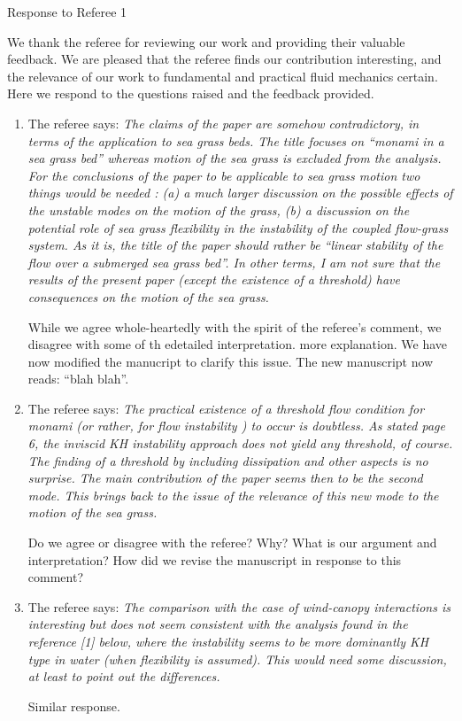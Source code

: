 \documentclass[letterpaper,10pt]{article}
\begin{document}
\centerline{Response to Referee 1}
We thank the referee for reviewing our work and providing their valuable feedback. 
We are pleased that the referee finds our contribution interesting, and the relevance of our work to fundamental and practical fluid mechanics certain.
Here we respond to the questions raised and the feedback provided.

\begin{enumerate}
\item The referee says:
\textit{
The claims of the paper are somehow contradictory, in terms of the application to sea grass beds. The title focuses on “monami in a sea grass bed” whereas motion of the sea grass is excluded from the analysis.  For the conclusions of the paper to be applicable to sea grass motion two things would be needed : (a) a much larger discussion on the possible effects of the unstable modes on the motion of the grass, (b) a discussion on the potential role of sea grass flexibility in the instability of the coupled flow-grass system. As it is, the  title of the paper should rather  be “linear stability of the flow over a submerged sea grass bed”. In other terms, I am not sure that the results of the present paper (except the existence of a threshold) have consequences on the motion of the sea grass.
}

While we agree whole-heartedly with the spirit of the referee's comment, we disagree with some of th edetailed interpretation. more explanation. We have now modified the manucript to clarify this issue. The new manuscript now reads: ``blah blah''.

\item The referee says:
\textit{
The practical existence of a threshold flow condition for monami (or rather,  for flow instability ) to occur is doubtless.  As stated page 6, the inviscid KH instability approach does not yield any threshold, of course. The finding of a threshold by including dissipation and other aspects is no surprise. The main contribution of the paper seems then to be the second mode. This brings back to the issue of the relevance of this new mode to the motion of the sea grass.
}

Do we agree or disagree with the referee? Why? What is our argument and interpretation? How did we revise the manuscript in response to this comment?

\item The referee says:
\textit{
The comparison with the case of wind-canopy interactions is interesting but does not seem consistent with the analysis found in the reference [1]  below, where the instability seems to be more dominantly KH type in water  (when flexibility is assumed).  This would need some discussion, at least to point out the differences.
}

Similar response.

\end{enumerate}
\end{document}

